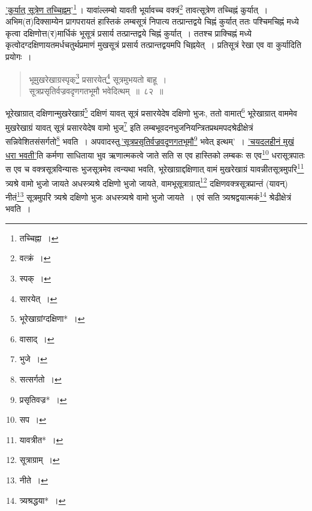 \documentclass[10pt, openany]{book}
\begin{document}
{\hyperref[81]{'कुर्यात् सूत्रेण तच्चिह्नम्'}\renewcommand{\thefootnote}{\s १४}\footnote{\s तच्चिह्ना~।}\,। यावांल्लम्बो यावती भूर्यावच्च वक्त्रं\renewcommand{\thefootnote}{\s १५}\footnote{\s  वत्क्रं~।} तावत्सूत्रेण तच्चिह्नं कुर्यात्~। अभिम(त)दिक्साम्येन प्रागपरायतं हास्तिकं लम्बसूत्रं निपात्य
तत्प्रान्तद्वये चिह्नं कुर्यात् ततः पश्चिमचिह्नं मध्ये कृत्वा दक्षिणोत्त(र)मार्धिकं भूसूत्रं प्रसार्य तत्प्रान्तद्वये चिह्नं कुर्यात्~। ततश्च प्राक्चिह्नं मध्ये कृत्वोदग्दक्षिणायतमर्धचतुर्थप्रमाणं
मुखसूत्रं प्रसार्य तत्प्रान्तद्वयमपि चिह्नयेत्~। प्रतिसूत्रं रेखा एव वा कुर्यादिति प्रयोगः~।
   
 \label{82}
\begin{quote}

{\bs भूमुखरेखाग्रस्पृक्\renewcommand{\thefootnote}{\s १६}\footnote{\s *स्पक्~।} प्रसारयेत्\renewcommand{\thefootnote}{\s १७}\footnote{\s सारयेत्~।} सूत्रमुभयतो बाहू~। \\
सूत्रप्रसृतिर्वज्रवदृणगतभूमौ भवेदित्थम्~॥~८२~॥}\end{quote}
\vspace{2mm}


\newpage

{भूरेखाग्रात् दक्षिणान्मुखरेखाग्रं\renewcommand{\thefootnote}{\s १}\footnote{\s भूरेखाग्रांग्दक्षिणा*~।} दक्षिणं यावत् सूत्रं
प्रसारयेदेष दक्षिणो भुजः, ततो वामात्\renewcommand{\thefootnote}{\s २}\footnote{\s वासाद्~।}}
{भूरेखाग्रात् वाममेव मुखरेखाग्रं यावत् सूत्रं प्रसारयेदेष वामो भुज\renewcommand{\thefootnote}{\s ३}\footnote{\s भुजे~।}
इति लम्बभूवदनभुजनियन्त्रितप्रथमपदश्रेढीक्षेत्रं सन्निवेशितसंसर्गतो\renewcommand{\thefootnote}{\s ४}\footnote{\s *सत्सर्गतो~।} भवति~। अपवादस्तु\textendash \,\hyperref[82]{'सूत्रप्रसृतिर्वज्रवदृणगतभूमौ\renewcommand{\thefootnote}{\s ५}\footnote{\s *प्रसृतिवज्र*~।}}
भवेत् इत्थम्'}~। \hyperref[81]{'चयदलहीनं मुखं धरा भवती'}ति कर्मणा साधिताया भुव
ऋणात्मकत्वे जाते सति
{स एव हास्तिको लम्बकः स एव\renewcommand{\thefootnote}{\s ६}\footnote{\s सप~।} धरासूत्रपातः स एव च वक्त्रसूत्रविन्यासः
भुजसूत्रमेव}
{त्वन्यथा भवति, भूरेखाग्राद्दक्षिणात् वामं मुखरेखाग्रं
यावन्नीतसूत्रमुपरि\renewcommand{\thefootnote}{\s ७}\footnote{\s यावत्रीत*~।} त्र्यश्रे वामो भुजो जायते}
{अधस्त्र्यश्रे दक्षिणो भुजो जायते, वामभूसूत्राग्रात्\renewcommand{\thefootnote}{\s ८}\footnote{\s *सूत्राग्राम्~।}
दक्षिणवक्त्रसूत्रप्रान्तं (यावन्) नीतं\renewcommand{\thefootnote}{\s ९}\footnote{\s नीते~।} सूत्रमुपरि} 
{त्र्यश्रे दक्षिणो भुजः अधस्त्र्यश्रे वामो भुजो जायते~। एवं सति
त्र्यश्रद्वयात्मकं\renewcommand{\thefootnote}{\s १०}\footnote{\s त्र्यश्रद्धया*~।} श्रेढीक्षेत्रं भवति~।}
\vspace{-1mm}

}
\end{document}
